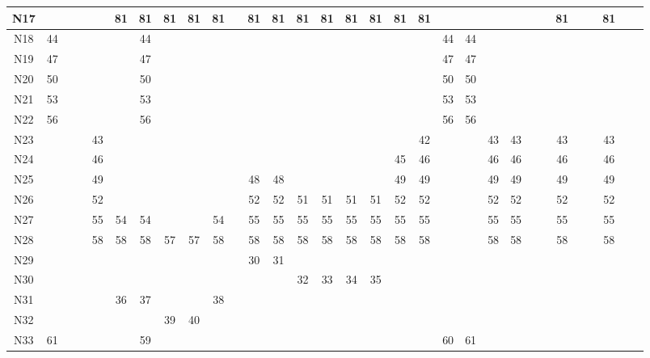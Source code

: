 \documentclass[11pt,a4paper]{article}
\begin{document}
\begin{lrbox}{\lltablebox}
\begin{tabular}{|*{31}{c|}}
N17 &  &  &  &  & 81 & 81 & 81 & 81 & 81 &  & 81 & 81 & 81 & 81 & 81 & 81 & 81 & 81 &  &  &  &  &  &  & 81 &  &  & 81 &  &  \\ \hline
N18 & 44 &  &  &  &  & 44 &  &  &  &  &  &  &  &  &  &  &  &  & 44 & 44 &  &  &  &  &  &  &  &  &  &  \\ \hline
N19 & 47 &  &  &  &  & 47 &  &  &  &  &  &  &  &  &  &  &  &  & 47 & 47 &  &  &  &  &  &  &  &  &  &  \\ \hline
N20 & 50 &  &  &  &  & 50 &  &  &  &  &  &  &  &  &  &  &  &  & 50 & 50 &  &  &  &  &  &  &  &  &  &  \\ \hline
N21 & 53 &  &  &  &  & 53 &  &  &  &  &  &  &  &  &  &  &  &  & 53 & 53 &  &  &  &  &  &  &  &  &  &  \\ \hline
N22 & 56 &  &  &  &  & 56 &  &  &  &  &  &  &  &  &  &  &  &  & 56 & 56 &  &  &  &  &  &  &  &  &  &  \\ \hline
N23 &  &  &  & 43 &  &  &  &  &  &  &  &  &  &  &  &  &  & 42 &  &  & 43 & 43 &  &  & 43 &  &  & 43 &  &  \\ \hline
N24 &  &  &  & 46 &  &  &  &  &  &  &  &  &  &  &  &  & 45 & 46 &  &  & 46 & 46 &  &  & 46 &  &  & 46 &  &  \\ \hline
N25 &  &  &  & 49 &  &  &  &  &  &  & 48 & 48 &  &  &  &  & 49 & 49 &  &  & 49 & 49 &  &  & 49 &  &  & 49 &  &  \\ \hline
N26 &  &  &  & 52 &  &  &  &  &  &  & 52 & 52 & 51 & 51 & 51 & 51 & 52 & 52 &  &  & 52 & 52 &  &  & 52 &  &  & 52 &  &  \\ \hline
N27 &  &  &  & 55 & 54 & 54 &  &  & 54 &  & 55 & 55 & 55 & 55 & 55 & 55 & 55 & 55 &  &  & 55 & 55 &  &  & 55 &  &  & 55 &  &  \\ \hline
N28 &  &  &  & 58 & 58 & 58 & 57 & 57 & 58 &  & 58 & 58 & 58 & 58 & 58 & 58 & 58 & 58 &  &  & 58 & 58 &  &  & 58 &  &  & 58 &  &  \\ \hline
N29 &  &  &  &  &  &  &  &  &  &  & 30 & 31 &  &  &  &  &  &  &  &  &  &  &  &  &  &  &  &  &  &  \\ \hline
N30 &  &  &  &  &  &  &  &  &  &  &  &  & 32 & 33 & 34 & 35 &  &  &  &  &  &  &  &  &  &  &  &  &  &  \\ \hline
N31 &  &  &  &  & 36 & 37 &  &  & 38 &  &  &  &  &  &  &  &  &  &  &  &  &  &  &  &  &  &  &  &  &  \\ \hline
N32 &  &  &  &  &  &  & 39 & 40 &  &  &  &  &  &  &  &  &  &  &  &  &  &  &  &  &  &  &  &  &  &  \\ \hline
N33 & 61 &  &  &  &  & 59 &  &  &  &  &  &  &  &  &  &  &  &  & 60 & 61 &  &  &  &  &  &  &  &  &  &  \\ \hline

\end{tabular}
\end{lrbox}
\end{document}
